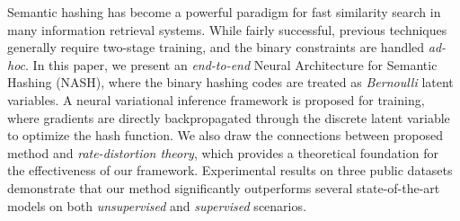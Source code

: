 Semantic hashing has become a powerful paradigm for fast similarity search in many information retrieval systems. While fairly successful, previous techniques generally require two-stage training, and the binary constraints are handled \emph{ad-hoc}. In this paper, we present an \emph{end-to-end} Neural Architecture for Semantic Hashing (NASH), where the binary hashing codes are treated as \emph{Bernoulli} latent variables. A neural variational inference framework is proposed for training, where gradients are directly backpropagated through the discrete latent variable to optimize the hash function. We also draw the connections between proposed method and \emph{rate-distortion theory}, which provides a theoretical foundation for the effectiveness of our framework. Experimental results on three public datasets demonstrate that our method significantly outperforms several state-of-the-art models on both \emph{unsupervised} and \emph{supervised} scenarios.
